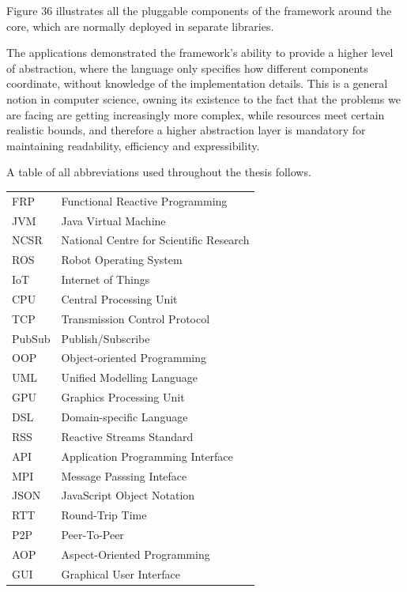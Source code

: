 \documentclass{dithesis}
\begin{document}
Figure 36 illustrates all the pluggable components of the framework around the core, which are normally deployed in separate libraries.


The applications demonstrated the framework's ability to provide a higher level of abstraction, where the language only specifies how different components coordinate, without knowledge of the implementation details. This is a general notion in computer science, owning its existence to the fact that the problems we are facing are getting increasingly more complex, while resources meet certain realistic bounds, and therefore a higher abstraction layer is mandatory for maintaining readability, efficiency and expressibility.

\begin{thesisabbreviations}
A table of all abbreviations used throughout the thesis follows.

\begin{tabularx}{\textwidth}{|X|X|}
  \hline
  FRP & Functional Reactive Programming \\
  JVM & Java Virtual Machine \\
  NCSR & National Centre for Scientific Research \\
  ROS & Robot Operating System \\
  IoT & Internet of Things \\
  CPU & Central Processing Unit \\
  TCP & Transmission Control Protocol \\
  PubSub & Publish/Subscribe \\
  OOP & Object-oriented Programming \\
  UML & Unified Modelling Language \\
  GPU & Graphics Processing Unit \\
  DSL & Domain-specific Language \\
  RSS & Reactive Streams Standard \\
  API & Application Programming Interface \\
  MPI & Message Passsing Inteface \\
  JSON & JavaScript Object Notation \\
  RTT & Round-Trip Time \\ 
  P2P & Peer-To-Peer \\
  AOP & Aspect-Oriented Programming \\
  GUI & Graphical User Interface \\
  \hline
\end{tabularx}

\end{thesisabbreviations}

\newpage

{}
\end{document}
